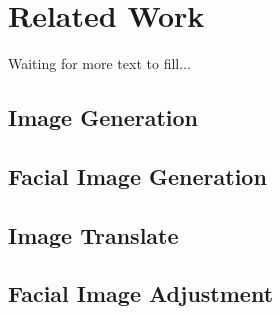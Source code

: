\section{Related Work}

Waiting for more text to fill...

\subsection{Image Generation}
\subsection{Facial Image Generation}
\subsection{Image Translate}
\subsection{Facial Image Adjustment}
